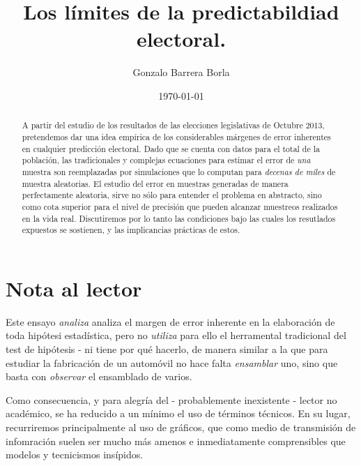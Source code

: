\documentclass[12pt, a4paper]{article}
\begin{document}
\title{Los l\'imites de la predictabildiad electoral.}
\author{Gonzalo Barrera Borla}
\date{\today}

\maketitle

\pagebreak

\begin{abstract}
	A partir del estudio de los resultados de las elecciones legislativas de Octubre 2013, pretendemos dar una idea emp\'irica de los considerables m\'argenes de error inherentes en cualquier predicci\'on electoral. Dado que se cuenta con datos para el total de la poblaci\'on, las tradicionales y complejas ecuaciones para estimar el error de \emph{una} muestra son reemplazadas por simulaciones que lo computan para \emph{decenas de miles} de muestra aleatorias.
	El estudio del error en muestras generadas de manera perfectamente aleatoria, sirve no s\'olo para entender el problema en abstracto, sino como cota superior para el nivel de precisi\'on que pueden alcanzar muestreos realizados en la vida real. Discutiremos por lo tanto las condiciones bajo las cuales los resutlados expuestos se sostienen, y las implicancias pr\'acticas de estos.
\end{abstract}

\pagebreak

\tableofcontents

\pagebreak

\section{Nota al lector}

Este ensayo \emph{analiza} analiza el margen de error inherente en la elaboraci\'on de toda hip\'otesi estad\'istica, pero no \emph{utiliza} para ello el herramental tradicional del test de hip\'otesis - ni tiene por qu\'e hacerlo, de manera similar a la que para estudiar la fabricaci\'on de un autom\'ovil no hace falta \emph{ensamblar} uno, sino que basta con \emph{observar} el ensamblado de varios.

Como consecuencia, y para alegr\'ia del - probablemente inexistente - lector no acad\'emico, se ha reducido a un m\'inimo el uso de t\'erminos t\'ecnicos. En su lugar, recurriremos principalmente al uso de gr\'aficos, que como medio de transmisi\'on de infomraci\'on suelen ser mucho m\'as amenos e inmediatamente comprensibles que modelos y tecnicismos ins\'ipidos.
\end{document}
